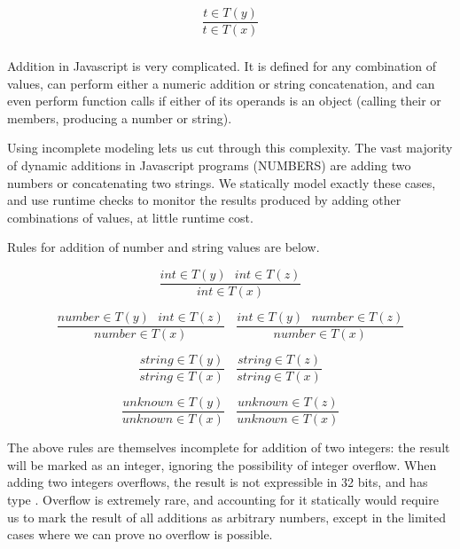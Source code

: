 \begin{equation*}
\frac{t \in T(y)}{t \in T(x)}
\end{equation*}

\subsubsection{}

Addition in Javascript is very complicated. It is defined for any
combination of values, can perform either a numeric addition or
string concatenation, and can even perform function calls if either of
its operands is an object (calling their  or
 members, producing a number or string).

Using incomplete modeling lets us cut through this complexity.
The vast majority of dynamic additions in Javascript programs (NUMBERS)
are adding two numbers or concatenating two strings.
We statically model exactly these cases, and use runtime checks to monitor
the results produced by adding other combinations of values,
at little runtime cost.

Rules for addition of number and string values are below.

\begin{equation*}
\frac{int \in T(y) ~~~ int \in T(z)}{int \in T(x)}
\end{equation*}

\begin{equation*}
\frac{number \in T(y) ~~~ int \in T(z)}{number \in T(x)}
~~~~
\frac{int \in T(y) ~~~ number \in T(z)}{number \in T(x)}
\end{equation*}

\begin{equation*}
\frac{string \in T(y)}{string \in T(x)}
~~~~
\frac{string \in T(z)}{string \in T(x)}
\end{equation*}

\begin{equation*}
\frac{unknown \in T(y)}{unknown \in T(x)}
~~~~
\frac{unknown \in T(z)}{unknown \in T(x)}
\end{equation*}

The above rules are themselves incomplete for addition of two integers:
the result will be marked as an integer, ignoring the possibility of
integer overflow.
When adding two integers overflows, the result is not expressible in
32 bits, and has type .
Overflow is extremely rare, and accounting for it statically would require
us to mark the result of all additions as arbitrary numbers,
except in the limited cases where we can prove no overflow is possible.

